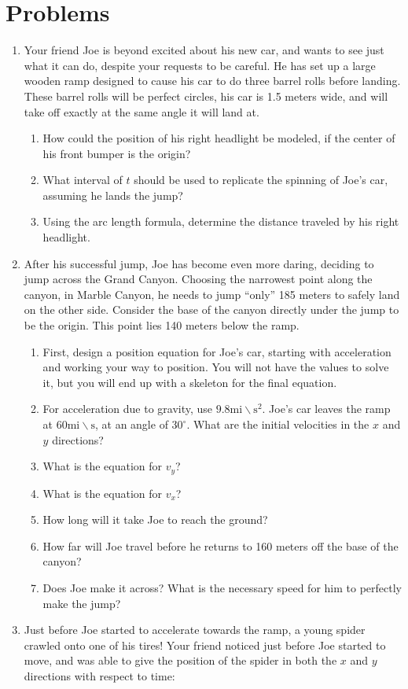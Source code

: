 \documentclass{ximera}
\begin{document}
\section{Problems}
\begin{enumerate}
\item Your friend Joe is beyond excited about his new car, and wants to see just what it can do, despite your requests to be careful. He has set up a large wooden ramp designed to cause his car to do three barrel rolls before landing. These barrel rolls will be perfect circles, his car is 1.5 meters wide, and will take off exactly at the same angle it will land at.
\begin{enumerate}
\item How could the position of his right headlight be modeled, if the center of his front bumper is the origin?
\item What interval of $t$ should be used to replicate the spinning of Joe's car, assuming he lands the jump?
\item Using the arc length formula, determine the distance traveled by his right headlight.
\end{enumerate}
\item After his successful jump, Joe has become even more daring, deciding to jump across the Grand Canyon. Choosing the narrowest point along the canyon, in Marble Canyon, he needs to jump ``only'' 185 meters to safely land on the other side. Consider the base of the canyon directly under the jump to be the origin. This point lies 140 meters below the ramp.
\begin{enumerate}
\item First, design a position equation for Joe's car, starting with acceleration and working your way to position. You will not have the values to solve it, but you will end up with a skeleton for the final equation.
\item For acceleration due to gravity, use $9.8 \text{mi} \backslash \text{s}^2$. Joe's car leaves the ramp at $60 \text{mi}\backslash \text{s}$, at an angle of $30^\circ$. What are the initial velocities in the $x$ and $y$ directions?
\item What is the equation for $v_{y}$?
\item What is the equation for $v_x$?
\item How long will it take Joe to reach the ground?
\item How far will Joe travel before he returns to 160 meters off the base of the canyon?
\item Does Joe make it across? What is the necessary speed for him to perfectly make the jump?
\end{enumerate}
\item Just before Joe started to accelerate towards the ramp, a young spider crawled onto one of his tires! Your friend noticed just before Joe started to move, and was able to give the position of the spider in both the $x$ and $y$ directions with respect to time:


\end{enumerate}
\end{document}
